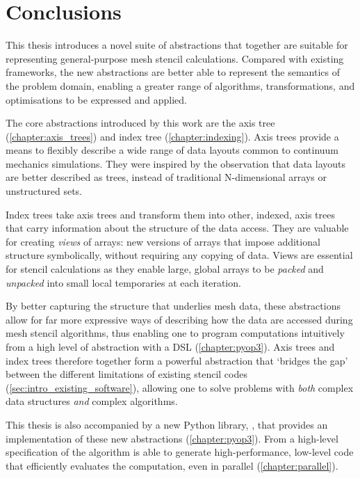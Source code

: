 \documentclass[thesis]{subfiles}
\begin{document}
\chapter{Conclusions}
\label{chapter:conclusions}

This thesis introduces a novel suite of abstractions that together are suitable for representing general-purpose mesh stencil calculations.
Compared with existing frameworks, the new abstractions are better able to represent the semantics of the problem domain, enabling a greater range of algorithms, transformations, and optimisations to be expressed and applied.

The core abstractions introduced by this work are the axis tree (\cref{chapter:axis_trees}) and index tree (\cref{chapter:indexing}).
Axis trees provide a means to flexibly describe a wide range of data layouts common to continuum mechanics simulations.
They were inspired by the observation that data layouts are better described as trees, instead of traditional N-dimensional arrays or unstructured sets.

Index trees take axis trees and transform them into other, indexed, axis trees that carry information about the structure of the data access.
They are valuable for creating \emph{views} of arrays: new versions of arrays that impose additional structure symbolically, without requiring any copying of data.
Views are essential for stencil calculations as they enable large, global arrays to be \emph{packed} and \emph{unpacked} into small local temporaries at each iteration.

By better capturing the structure that underlies mesh data, these abstractions allow for far more expressive ways of describing how the data are accessed during mesh stencil algorithms, thus enabling one to program computations intuitively from a high level of abstraction with a DSL (\cref{chapter:pyop3}).
Axis trees and index trees therefore together form a powerful abstraction that `bridges the gap' between the different limitations of existing stencil codes (\cref{sec:intro_existing_software}), allowing one to solve problems with \emph{both} complex data structures \emph{and} complex algorithms.

This thesis is also accompanied by a new Python library, , that provides an implementation of these new abstractions (\cref{chapter:pyop3}).
From a high-level specification of the algorithm  is able to generate high-performance, low-level code that efficiently evaluates the computation, even in parallel (\cref{chapter:parallel}).
\end{document}
